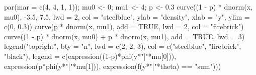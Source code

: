 \documentclass[
  letterpaper,
  DIV=11,
  numbers=noendperiod]{scrreprt}
\newenvironment{Shaded}{\begin{snugshade}}{\end{snugshade}}
\newcommand{\AttributeTok}[1]{\textcolor[rgb]{0.40,0.45,0.13}{#1}}
\newcommand{\ConstantTok}[1]{\textcolor[rgb]{0.56,0.35,0.01}{#1}}
\newcommand{\DecValTok}[1]{\textcolor[rgb]{0.68,0.00,0.00}{#1}}
\newcommand{\FloatTok}[1]{\textcolor[rgb]{0.68,0.00,0.00}{#1}}
\newcommand{\FunctionTok}[1]{\textcolor[rgb]{0.28,0.35,0.67}{#1}}
\newcommand{\NormalTok}[1]{\textcolor[rgb]{0.00,0.23,0.31}{#1}}
\newcommand{\OtherTok}[1]{\textcolor[rgb]{0.00,0.23,0.31}{#1}}
\newcommand{\SpecialCharTok}[1]{\textcolor[rgb]{0.37,0.37,0.37}{#1}}
\newcommand{\StringTok}[1]{\textcolor[rgb]{0.13,0.47,0.30}{#1}}
\begin{document}
\begin{Shaded}
\begin{Highlighting}[]
\FunctionTok{par}\NormalTok{(}\AttributeTok{mar =} \FunctionTok{c}\NormalTok{(}\DecValTok{4}\NormalTok{, }\DecValTok{4}\NormalTok{, }\DecValTok{1}\NormalTok{, }\DecValTok{1}\NormalTok{)); mu0 }\OtherTok{\textless{}{-}} \DecValTok{0}\NormalTok{; mu1 }\OtherTok{\textless{}{-}} \DecValTok{4}\NormalTok{; p }\OtherTok{\textless{}{-}} \FloatTok{0.3}
\FunctionTok{curve}\NormalTok{((}\DecValTok{1} \SpecialCharTok{{-}}\NormalTok{ p) }\SpecialCharTok{*} \FunctionTok{dnorm}\NormalTok{(x, mu0), }\SpecialCharTok{{-}}\FloatTok{3.5}\NormalTok{, }\FloatTok{7.5}\NormalTok{, }\AttributeTok{lwd =} \DecValTok{2}\NormalTok{, }\AttributeTok{col =} \StringTok{"steelblue"}\NormalTok{,}
      \AttributeTok{ylab =} \StringTok{"density"}\NormalTok{, }\AttributeTok{xlab =} \StringTok{"y"}\NormalTok{, }\AttributeTok{ylim =} \FunctionTok{c}\NormalTok{(}\DecValTok{0}\NormalTok{, }\FloatTok{0.3}\NormalTok{))}
\FunctionTok{curve}\NormalTok{(p }\SpecialCharTok{*} \FunctionTok{dnorm}\NormalTok{(x, mu1), }\AttributeTok{add =} \ConstantTok{TRUE}\NormalTok{, }\AttributeTok{lwd =} \DecValTok{2}\NormalTok{, }\AttributeTok{col =} \StringTok{"firebrick"}\NormalTok{)}
\FunctionTok{curve}\NormalTok{((}\DecValTok{1} \SpecialCharTok{{-}}\NormalTok{ p) }\SpecialCharTok{*} \FunctionTok{dnorm}\NormalTok{(x, mu0) }\SpecialCharTok{+}\NormalTok{ p }\SpecialCharTok{*} \FunctionTok{dnorm}\NormalTok{(x, mu1), }\AttributeTok{add =} \ConstantTok{TRUE}\NormalTok{, }\AttributeTok{lwd =} \DecValTok{3}\NormalTok{)}
\FunctionTok{legend}\NormalTok{(}\StringTok{"topright"}\NormalTok{, }\AttributeTok{bty =} \StringTok{"n"}\NormalTok{, }\AttributeTok{lwd =} \FunctionTok{c}\NormalTok{(}\DecValTok{2}\NormalTok{, }\DecValTok{2}\NormalTok{, }\DecValTok{3}\NormalTok{),}
       \AttributeTok{col =} \FunctionTok{c}\NormalTok{(}\StringTok{"steelblue"}\NormalTok{, }\StringTok{"firebrick"}\NormalTok{, }\StringTok{"black"}\NormalTok{),}
       \AttributeTok{legend =} \FunctionTok{c}\NormalTok{(}\FunctionTok{expression}\NormalTok{((}\DecValTok{1}\SpecialCharTok{{-}}\NormalTok{p)}\SpecialCharTok{*}\FunctionTok{phi}\NormalTok{(y}\SpecialCharTok{*}\StringTok{"|"}\SpecialCharTok{*}\NormalTok{mu[}\DecValTok{0}\NormalTok{])),}
                  \FunctionTok{expression}\NormalTok{(p}\SpecialCharTok{*}\FunctionTok{phi}\NormalTok{(y}\SpecialCharTok{*}\StringTok{"|"}\SpecialCharTok{*}\NormalTok{mu[}\DecValTok{1}\NormalTok{])),}
                  \FunctionTok{expression}\NormalTok{(}\FunctionTok{f}\NormalTok{(y}\SpecialCharTok{*}\StringTok{"|"}\SpecialCharTok{*}\NormalTok{theta) }\SpecialCharTok{==} \StringTok{"sum"}\NormalTok{)))}
\end{Highlighting}
\end{Shaded}
\end{document}

